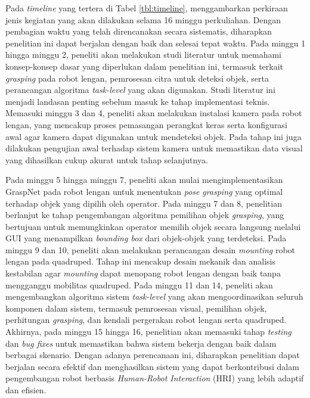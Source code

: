 Pada \emph{timeline} yang tertera di Tabel \ref{tbl:timeline}, menggambarkan perkiraan jenis kegiatan
yang akan dilakukan selama 16 minggu perkuliahan. Dengan pembagian waktu yang telah direncanakan secara
sistematis, diharapkan penelitian ini dapat berjalan dengan baik dan selesai tepat waktu. Pada minggu 1
hingga minggu 2, peneliti akan melakukan studi literatur untuk memahami konsep-konsep dasar yang diperlukan
dalam penelitian ini, termasuk terkait \emph{grasping} pada robot lengan, pemrosesan citra untuk deteksi objek,
serta perancangan algoritma \emph{task-level} yang akan digunakan. Studi literatur ini menjadi landasan penting
sebelum masuk ke tahap implementasi teknis. Memasuki minggu 3 dan 4, peneliti akan melakukan instalasi kamera
pada robot lengan, yang mencakup proses pemasangan perangkat keras serta konfigurasi awal agar kamera dapat digunakan
untuk mendeteksi objek. Pada tahap ini juga dilakukan pengujian awal terhadap sistem kamera untuk memastikan data visual
yang dihasilkan cukup akurat untuk tahap selanjutnya.

Pada minggu 5 hingga minggu 7, peneliti akan mulai mengimplementasikan GraspNet pada robot lengan untuk menentukan
\emph{pose} \emph{grasping} yang optimal terhadap objek yang dipilih oleh operator. Pada minggu 7 dan 8, penelitian
berlanjut ke tahap pengembangan algoritma pemilihan objek \emph{grasping}, yang bertujuan untuk memungkinkan operator
memilih objek secara langsung melalui GUI yang menampilkan \emph{bounding box} dari objek-objek yang terdeteksi.
Pada minggu 9 dan 10, peneliti akan melakukan perancangan desain \emph{mounting} robot lengan pada quadruped.
Tahap ini mencakup desain mekanik dan analisis kestabilan agar \emph{mounting} dapat menopang robot lengan
dengan baik tanpa mengganggu mobilitas quadruped. Pada minggu 11 dan 14, peneliti akan mengembangkan algoritma
sistem \emph{task-level} yang akan mengoordinasikan seluruh komponen dalam sistem, termasuk pemrosesan visual,
pemilihan objek, perhitungan \emph{grasping}, dan kendali pergerakan robot lengan serta quadruped. Akhirnya,
pada minggu 15 hingga 16, penelitian akan memasuki tahap \emph{testing} dan \emph{bug fixes} untuk memastikan
bahwa sistem bekerja dengan baik dalam berbagai skenario. Dengan adanya perencanaan ini, diharapkan penelitian
dapat berjalan secara efektif dan menghasilkan sistem yang dapat berkontribusi dalam pengembangan robot berbasis
\emph{Human-Robot Interaction} (HRI) yang lebih adaptif dan efisien.
